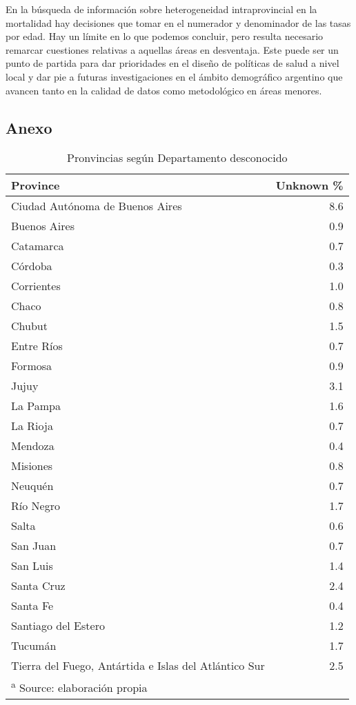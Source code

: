 \documentclass[12pt,]{article}
\begin{document}
En la búsqueda de información sobre heterogeneidad intraprovincial en la
mortalidad hay decisiones que tomar en el numerador y denominador de las
tasas por edad. Hay un límite en lo que podemos concluir, pero resulta
necesario remarcar cuestiones relativas a aquellas áreas en desventaja.
Este puede ser un punto de partida para dar prioridades en el diseño de
políticas de salud a nivel local y dar pie a futuras investigaciones en
el ámbito demográfico argentino que avancen tanto en la calidad de datos
como metodológico en áreas menores.

\hypertarget{anexo}{%
\subsection{Anexo}\label{anexo}}

\begin{table}

\caption{\label{tab:SinDEP}Pronvincias según Departamento desconocido}
\centering
\begin{tabular}[t]{l|r}
\hline
Province & Unknown \%\\
\hline
Ciudad Autónoma de Buenos Aires & 8.6\\
\hline
Buenos Aires & 0.9\\
\hline
Catamarca & 0.7\\
\hline
Córdoba & 0.3\\
\hline
Corrientes & 1.0\\
\hline
Chaco & 0.8\\
\hline
Chubut & 1.5\\
\hline
Entre Ríos & 0.7\\
\hline
Formosa & 0.9\\
\hline
Jujuy & 3.1\\
\hline
La Pampa & 1.6\\
\hline
La Rioja & 0.7\\
\hline
Mendoza & 0.4\\
\hline
Misiones & 0.8\\
\hline
Neuquén & 0.7\\
\hline
Río Negro & 1.7\\
\hline
Salta & 0.6\\
\hline
San Juan & 0.7\\
\hline
San Luis & 1.4\\
\hline
Santa Cruz & 2.4\\
\hline
Santa Fe & 0.4\\
\hline
Santiago del Estero & 1.2\\
\hline
Tucumán & 1.7\\
\hline
Tierra del Fuego, Antártida e Islas del Atlántico Sur & 2.5\\
\hline
\multicolumn{2}{l}{\textsuperscript{a} Source: elaboración propia}\\
\end{tabular}
\end{table}
\end{document}
